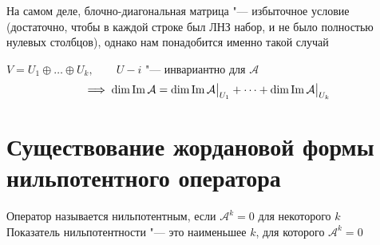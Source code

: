\begin{remark}
	На самом деле, блочно-диагональная матрица "--- избыточное условие (достаточно, чтобы в каждой строке был ЛНЗ набор, и не было полностью нулевых столбцов), однако нам понадобится именно такой случай
\end{remark}

\begin{implication}
	$ V = U_1 \oplus \dots \oplus U_k, \qquad U-i $ "--- инвариантно для $ \mathcal{A} $
	$$ \implies \dim \operatorname{Im} \mathcal{A} = \dim \operatorname{Im} \mathcal{A}\big|_{U_1}^{} + \dots + \dim \operatorname{Im} \mathcal{A}\big|_{U_k}^{} $$
\end{implication}

\section{Существование жордановой формы нильпотентного оператора}

\begin{definition}
	Оператор называется нильпотентным, если $ \mathcal{A}^k = 0 $ для некоторого $ k $ \\
	Показатель нильпотентности "--- это наименьшее $ k $, для которого $ \mathcal{A}^k = 0 $
\end{definition}

